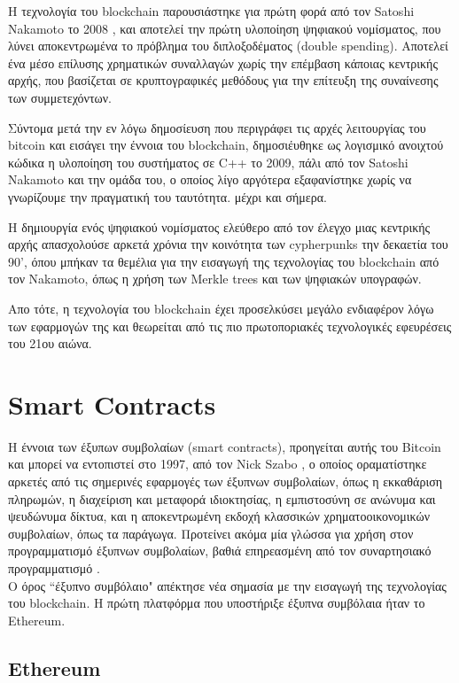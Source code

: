 
Η τεχνολογία του blockchain παρουσιάστηκε για πρώτη φορά από τον Satoshi Nakamoto το 2008
\cite{bitcoin}, και αποτελεί την πρώτη υλοποίηση ψηφιακού νομίσματος, που λύνει αποκεντρωμένα
το πρόβλημα του διπλοξοδέματος (double spending).
Αποτελεί ένα μέσο επίλυσης χρηματικών συναλλαγών χωρίς την επέμβαση κάποιας κεντρικής αρχής,
που βασίζεται σε κρυπτογραφικές μεθόδους για την επίτευξη της συναίνεσης των συμμετεχόντων.

Σύντομα μετά την εν λόγω δημοσίευση που περιγράφει τις αρχές λειτουργίας του bitcoin και εισάγει
την έννοια του blockchain, δημοσιέυθηκε ως λογισμικό ανοιχτού κώδικα η υλοποίηση του συστήματος
σε C++ το 2009, πάλι από τον Satoshi Nakamoto και την ομάδα του, ο οποίος λίγο αργότερα εξαφανίστηκε
χωρίς να  γνωρίζουμε την πραγματική του ταυτότητα. μέχρι και σήμερα.


Η δημιουργία ενός ψηφιακού νομίσματος ελεύθερο από τον έλεγχο μιας κεντρικής αρχής απασχολούσε αρκετά χρόνια
την κοινότητα των cypherpunks την δεκαετία του 90', όπου μπήκαν τα θεμέλια για την
εισαγωγή της τεχνολογίας του blockchain από τον Nakamoto, όπως η χρήση των Merkle trees και των ψηφιακών υπογραφών.

Απο τότε, η τεχνολογία του blockchain έχει προσελκύσει μεγάλο ενδιαφέρον λόγω των εφαρμογών της και
θεωρείται από τις πιο πρωτοποριακές τεχνολογικές εφευρέσεις του 21ου αιώνα.




\section{ Smart Contracts}

Η έννοια των έξυπων συμβολαίων (smart contracts), προηγείται αυτής του Bitcoin και μπορεί να εντοπιστεί
στο 1997, από τον Nick Szabo \cite{szabo1}, ο οποίος οραματίστηκε αρκετές από τις σημερινές εφαρμογές
των έξυπνων συμβολαίων, όπως η εκκαθάριση πληρωμών, η διαχείριση και μεταφορά ιδιοκτησίας,  η
εμπιστοσύνη σε ανώνυμα και ψευδώνυμα δίκτυα, και η αποκεντρωμένη εκδοχή κλασσικών χρηματοοικονομικών συμβολαίων,
όπως τα παράγωγα. Προτείνει ακόμα μία γλώσσα για χρήση στον
προγραμματισμό έξυπνων συμβολαίων, βαθιά επηρεασμένη από τον συναρτησιακό προγραμματισμό
\cite{szabosmartcontract}.
\\
Ο όρος ``έξυπνο συμβόλαιο" απέκτησε νέα σημασία με την εισαγωγή της τεχνολογίας του blockchain. Η πρώτη
πλατφόρμα που υποστήριξε έξυπνα συμβόλαια ήταν το Ethereum.


\subsection{Ethereum}

